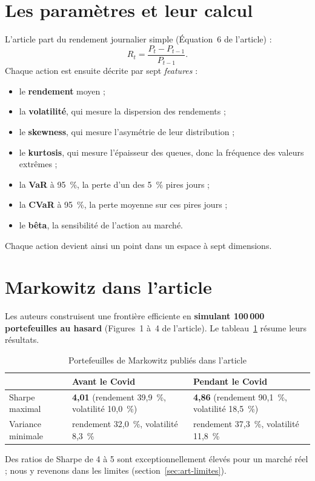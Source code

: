 \documentclass[11pt,a4paper]{article}
\newcommand{\pc}{~\%}
\begin{document}
\section{Les paramètres et leur calcul}\label{sec:art-features}
L'article part du rendement journalier simple (Équation~6 de l'article) :
\begin{equation}
R_t = \frac{P_t - P_{t-1}}{P_{t-1}}.
\end{equation}
Chaque action est ensuite décrite par sept \emph{features} :
\begin{itemize}
  \item le \textbf{rendement} moyen ;
  \item la \textbf{volatilité}, qui mesure la dispersion des rendements ;
  \item le \textbf{skewness}, qui mesure l'asymétrie de leur distribution ;
  \item le \textbf{kurtosis}, qui mesure l'épaisseur des queues, donc la fréquence des valeurs extrêmes ;
  \item la \textbf{VaR} à 95\pc{}, la perte d'un des 5\pc{} pires jours ;
  \item la \textbf{CVaR} à 95\pc{}, la perte moyenne sur ces pires jours ;
  \item le \textbf{bêta}, la sensibilité de l'action au marché.
\end{itemize}
Chaque action devient ainsi un point dans un espace à sept dimensions.

\section{Markowitz dans l'article}\label{sec:art-markowitz}
Les auteurs construisent une frontière efficiente en \textbf{simulant 100\,000 portefeuilles au hasard} (Figures~1 à~4 de l'article). Le tableau~\ref{tab:art-markowitz} résume leurs résultats.

\begin{table}[H]\centering\small
\caption{Portefeuilles de Markowitz publiés dans l'article}\label{tab:art-markowitz}
\begin{tabular}{lp{5cm}p{5cm}}\toprule
 & Avant le Covid & Pendant le Covid \\ \midrule
Sharpe maximal & \textbf{4,01} (rendement 39,9\pc{}, volatilité 10,0\pc{}) & \textbf{4,86} (rendement 90,1\pc{}, volatilité 18,5\pc{}) \\
Variance minimale & rendement 32,0\pc{}, volatilité 8,3\pc{} & rendement 37,3\pc{}, volatilité 11,8\pc{} \\
\bottomrule\end{tabular}
\end{table}
Des ratios de Sharpe de 4 à 5 sont exceptionnellement élevés pour un marché réel ; nous y revenons dans les limites (section~\ref{sec:art-limites}).
\end{document}
